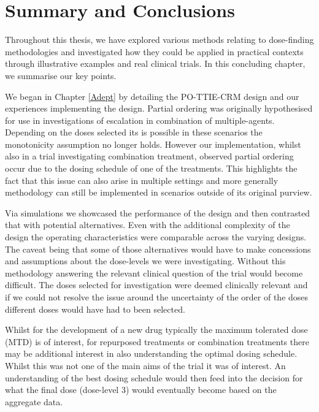 
\chapter{Summary and Conclusions} %

\label{Conclusion} %

Throughout this thesis, we have explored various methods relating to dose-finding methodologies and investigated how they could be applied in practical contexts through illustrative examples and real clinical trials. In this concluding chapter, we summarise our key points. 

We began in Chapter \ref{Adept} by detailing the PO-TTIE-CRM design \cite{wagesContinualReassessmentMethod2011, wagesUsingTimetoeventContinual2013} and our experiences implementing the design. Partial ordering was originally hypothesised for use in investigations of escalation in combination of multiple-agents. Depending on the doses selected its is possible in these scenarios the monotonicity assumption no longer holds. However our implementation, whilst also in a trial investigating combination treatment, observed partial ordering occur due to the dosing schedule of one of the treatments. This highlights the fact that this issue can also arise in multiple settings and more generally methodology can still be implemented in scenarios outside of its original purview.  

Via simulations we showcased the performance of the design and then contrasted that with potential alternatives. Even with the additional complexity of the design the operating characteristics were comparable across the varying designs. The caveat being that some of those alternatives would have to make concessions and assumptions about the dose-levels we were investigating. Without this methodology answering the relevant clinical question of the trial would become difficult. The doses selected for investigation were deemed clinically relevant and if we could not resolve the issue around the uncertainty of the order of the doses different doses would have had to been selected. 

Whilst for the development of a new drug typically the maximum tolerated dose (MTD) is of interest, for repurposed treatments or combination treatments there may be additional interest in also understanding the optimal dosing schedule. Whilst this was not one of the main aims of the trial it was of interest. An understanding of the best dosing schedule would then feed into the decision for what the final dose (dose-level 3) would eventually become based on the aggregate data. 

